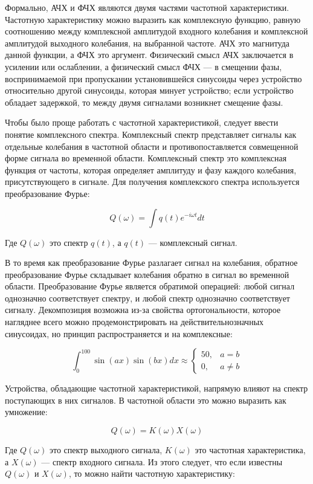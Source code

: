 \documentclass{report}
\begin{document}
Формально, АЧХ и ФЧХ являются двумя частями частотной характеристики. Частотную характеристику можно выразить как комплексную функцию, равную соотношению между комплексной амплитудой входного колебания и комплексной амплитудой выходного колебания, на выбранной частоте. АЧХ это магнитуда данной функции, а ФЧХ это аргумент. Физический смысл АЧХ заключается в усилении или ослаблении, а физический смысл ФЧХ --- в смещении фазы, воспринимаемой при пропускании установившейся синусоиды через устройство относительно другой синусоиды, которая минует устройство; если устройство обладает задержкой, то между двумя сигналами возникнет смещение фазы.

Чтобы было проще работать с частотной характеристикой, следует ввести понятие комплексного спектра. Комплексный спектр представляет сигналы как отдельные колебания в частотной области и противопоставляется совмещенной форме сигнала во временной области. Комплексный спектр это комплексная функция от частоты, которая определяет амплитуду и фазу каждого колебания, присутствующего в сигнале. Для получения комплекского спектра используется преобразование Фурье:

$$
Q(\omega) = \int q(t) e^{-i \omega t} dt
$$

Где $Q(\omega)$ это спектр $q(t)$, а $q(t)$ --- комплексный сигнал.

В то время как преобразование Фурье разлагает сигнал на колебания, обратное преобразование Фурье складывает колебания обратно в сигнал во временной области. Преобразование Фурье является обратимой операцией: любой сигнал однозначно соответствует спектру, и любой спектр однозначно соответствует сигналу. Декомпозиция возможна из-за свойства ортогональности, которое нагляднее всего можно продемонстрировать на действительнозначных синусоидах, но принцип распространяется и на комплексные:

$$
\int_{0}^{100} \sin(ax) \sin(bx) dx \approx
\begin{cases}
50, & a = b \\
0, & a \ne b
\end{cases}
$$

Устройства, обладающие частотной характеристикой, напрямую влияют на спектр поступающих в них сигналов. В частотной области это можно выразить как умножение:

$$
Q(\omega) = K(\omega) X(\omega)
$$

Где $Q(\omega)$ это спектр выходного сигнала, $K(\omega)$ это частотная характеристика, а $X(\omega)$ --- спектр входного сигнала. Из этого следует, что если известны $Q(\omega)$ и $X(\omega)$, то можно найти частотную характеристику:
\end{document}
